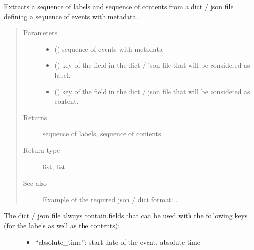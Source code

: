 \documentclass[letterpaper,10pt,english]{sphinxmanual}
\begin{document}
\begin{fulllineitems}
\label{\detokenize{index:GeneratorBuilder.extract_labels_and_contents_from_dict_memory}}
Extracts a sequence of labels and sequence of contents from a dict / json file defining a sequence of events with metadata..
\begin{quote}\begin{description}
\item[{Parameters}] \leavevmode\begin{itemize}
\item {} 
 () \textendash{} sequence of events with metadata

\item {} 
 () \textendash{} key of the field in the dict / json file that will be considered as label.

\item {} 
 () \textendash{} key of the field in the dict / json file that will be considered as content.

\end{itemize}

\item[{Returns}] \leavevmode
sequence of labels, sequence of contents

\item[{Return type}] \leavevmode
list, list

\item[{See also}] \leavevmode
Example of the required json / dict format: .

\end{description}\end{quote}
\begin{description}
\item[{The dict / json file always contain fields that can be used with the following keys (for the labels as well as the contents):}] \leavevmode\begin{itemize}
\item {} 
“absolute\_time”: start date of the event, absolute time


\end{itemize}
\end{description}
\end{fulllineitems}
\end{document}
